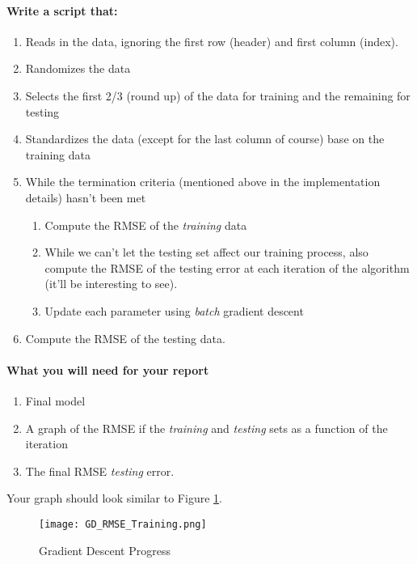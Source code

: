 \documentclass[12pt]{article}
\begin{document}
\paragraph{Write a script that:}
\begin{enumerate}
  \item Reads in the data, ignoring the first row (header) and first column (index).
  \item Randomizes the data
  \item Selects the first 2/3 (round up) of the data for training and the remaining for testing
  \item Standardizes the data (except for the last column of course) base on the training data
  \item While the termination criteria (mentioned above in the implementation details) hasn't been met
  \begin{enumerate}
  	\item Compute the RMSE of the \emph{training} data
  	\item While we can't let the testing set affect our training process, also compute the RMSE of the testing error at each iteration of the algorithm (it'll be interesting to see).
  	\item Update each parameter using \emph{batch} gradient descent
  \end{enumerate}
  \item Compute the RMSE of the testing data.
\end{enumerate}



\paragraph{What you will need for your report}
\begin{enumerate}
\item Final model
\item A graph of the RMSE if the \emph{training} and \emph{testing} sets as a function of the iteration
\item The final RMSE \emph{testing} error.
\end{enumerate}

Your graph should look similar to Figure \ref{GD}.
\begin{figure}[H]
\begin{center}
\texttt{[image: GD\_RMSE\_Training.png]}
\caption{Gradient Descent Progress}
\label{GD}
\end{center}
\end{figure}
\end{document}
